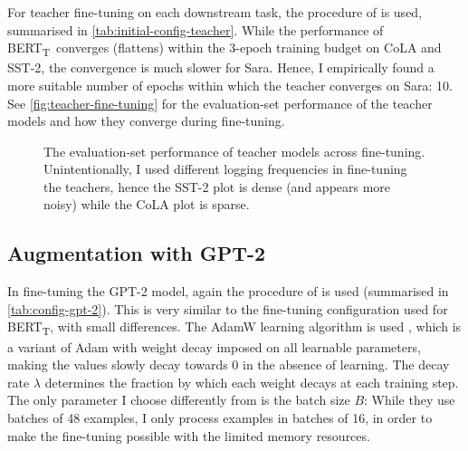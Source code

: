 \documentclass[bsc,frontabs,twoside,singlespacing,parskip,deptreport]{infthesis}
\def\BERTT{BERT\textsubscript{T}}
\begin{document}
{{{      For teacher fine-tuning on each downstream task, the procedure of \citeauthor{Tang_2019b} is used, summarised in \autoref{tab:initial-config-teacher}.
      While the performance of \BERTT~converges (flattens) within the 3-epoch training budget on CoLA and SST-2, the convergence is much slower for Sara. Hence, I empirically found a more suitable number of epochs within which the teacher converges on Sara: 10. See \autoref{fig:teacher-fine-tuning} for the evaluation-set performance of the teacher models and how they converge during fine-tuning.
      \begin{figure}[h!t]
        \centering
        \caption{The evaluation-set performance of teacher models across fine-tuning. Unintentionally, I used different logging frequencies in fine-tuning the teachers, hence the SST-2 plot is dense (and appears more noisy) while the CoLA plot is sparse.}
        \label{fig:teacher-fine-tuning}
      \end{figure}
    }

    \subsection{Augmentation with GPT-2}{
      In fine-tuning the GPT-2 model, again the procedure of \citeauthor{Tang_2019b} is used (summarised in \autoref{tab:config-gpt-2}). This is very similar to the fine-tuning configuration used for \BERTT, with small differences. The AdamW learning algorithm is used \citep{Loshchilov_2019}, which is a variant of Adam with weight decay imposed on all learnable parameters, making the values slowly decay towards 0 in the absence of learning. The decay rate $\lambda$ determines the fraction by which each weight decays at each training step.
      The only parameter I choose differently from \citeauthor{Tang_2019b} is the batch size $B$: While they use batches of 48 examples, I only process examples in batches of 16, in order to make the fine-tuning possible with the limited memory resources.

}}}
\end{document}
